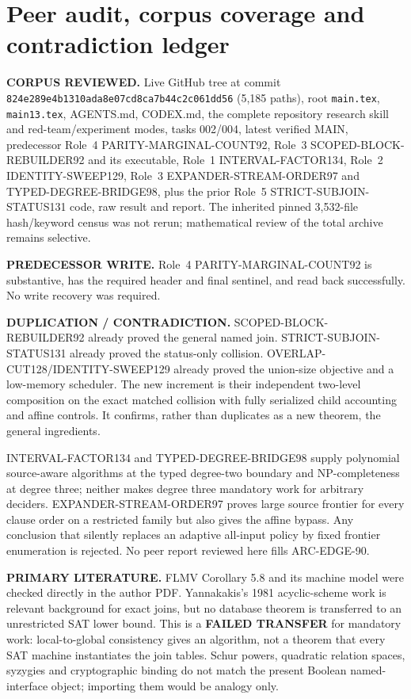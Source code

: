 \documentclass[11pt]{article}
\begin{document}
\section{Peer audit, corpus coverage and contradiction ledger}
\textbf{CORPUS REVIEWED.}  Live GitHub tree at commit
\texttt{824e289e4b1310ada8e07cd8ca7b44c2c061dd56} (5,185 paths), root
\texttt{main.tex}, \texttt{main13.tex}, AGENTS.md, CODEX.md, the complete
repository research skill and red-team/experiment modes, tasks 002/004,
latest verified MAIN, predecessor Role~4 PARITY-MARGINAL-COUNT92, Role~3
SCOPED-BLOCK-REBUILDER92 and its executable, Role~1 INTERVAL-FACTOR134,
Role~2 IDENTITY-SWEEP129, Role~3 EXPANDER-STREAM-ORDER97 and
TYPED-DEGREE-BRIDGE98, plus the prior Role~5 STRICT-SUBJOIN-STATUS131 code,
raw result and report.  The inherited pinned 3,532-file hash/keyword census
was not rerun; mathematical review of the total archive remains selective.

\textbf{PREDECESSOR WRITE.}  Role~4 PARITY-MARGINAL-COUNT92 is substantive,
has the required header and final sentinel, and read back successfully.  No
write recovery was required.

\textbf{DUPLICATION / CONTRADICTION.}  SCOPED-BLOCK-REBUILDER92 already proved
the general named join.  STRICT-SUBJOIN-STATUS131 already proved the
status-only collision.  OVERLAP-CUT128/IDENTITY-SWEEP129 already proved the
union-size objective and a low-memory scheduler.  The new increment is their
independent two-level composition on the exact matched collision with fully
serialized child accounting and affine controls.  It confirms, rather than
duplicates as a new theorem, the general ingredients.

INTERVAL-FACTOR134 and TYPED-DEGREE-BRIDGE98 supply polynomial source-aware
algorithms at the typed degree-two boundary and NP-completeness at degree
three; neither makes degree three mandatory work for arbitrary deciders.
EXPANDER-STREAM-ORDER97 proves large source frontier for every clause order
on a restricted family but also gives the affine bypass.  Any conclusion that
silently replaces an adaptive all-input policy by fixed frontier enumeration
is rejected.  No peer report reviewed here fills ARC-EDGE-90.

\textbf{PRIMARY LITERATURE.}  FLMV Corollary 5.8 and its machine model were
checked directly in the author PDF.  Yannakakis's 1981 acyclic-scheme work is
relevant background for exact joins, but no database theorem is transferred
to an unrestricted SAT lower bound.  This is a \textbf{FAILED TRANSFER} for
mandatory work: local-to-global consistency gives an algorithm, not a theorem
that every SAT machine instantiates the join tables.  Schur powers, quadratic
relation spaces, syzygies and cryptographic binding do not match the present
Boolean named-interface object; importing them would be analogy only.
\end{document}
